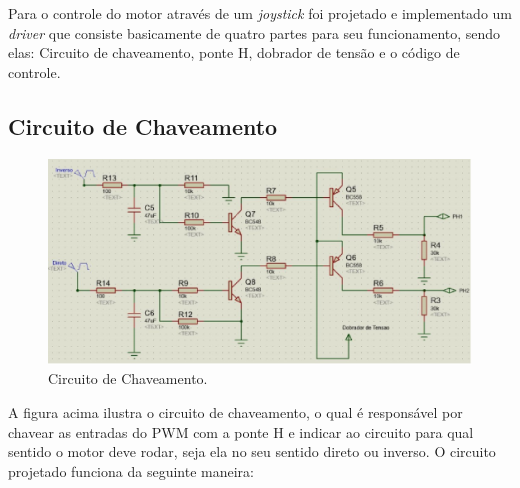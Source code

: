 Para o controle do motor através de um \textit{joystick} foi projetado e
implementado um \textit{driver} que consiste basicamente de quatro partes para
seu funcionamento, sendo elas: Circuito de chaveamento, ponte H, dobrador de
tensão e o código de controle.

\subsection{Circuito de Chaveamento}

\begin{figure}[h!]
  \centering
  \includegraphics[width=1.0\textwidth]{figuras/Chaveamento.jpg}
  \caption{Circuito de Chaveamento.}
\end{figure}

A figura acima ilustra o circuito de chaveamento, o qual é responsável por chavear as entradas do PWM com a ponte H e indicar ao circuito para qual sentido o motor deve rodar, seja ela no seu sentido direto ou inverso. O circuito projetado funciona da seguinte maneira:

